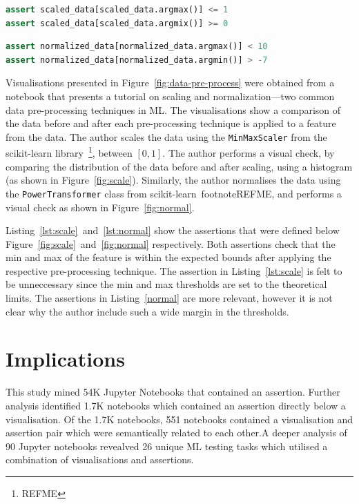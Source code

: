 \documentclass[conference]{IEEEtran}
\begin{document}
\begin{lstlisting}[language=Python, caption={Assertion to check that the mix and max of a feature fall within specified threshold derived from the visualisation presented in Figure~\ref{fig:scale}.}, label={lst:scale}]
assert scaled_data[scaled_data.argmax()] <= 1
assert scaled_data[scaled_data.argmix()] >= 0
\end{lstlisting}

\begin{lstlisting}[language=Python, caption={Similar premise as Listing~\ref{lst:scale}, however this assertion is based on Figure~\ref{fig:normal}.}, label={lst:normal}]
assert normalized_data[normalized_data.argmax()] < 10
assert normalized_data[normalized_data.argmin()] > -7
\end{lstlisting}

Visualisations presented in Figure~\ref{fig:data-pre-process} were obtained from a notebook that presents a tutorial on scaling and normalization---two common data pre-processing techniques in ML. The visualisations show a comparison of the data before and after each pre-processing technique is applied to a feature from the data. The author scales the data using the \texttt{MinMaxScaler} from the scikit-learn library~\footnote{REFME}, between $[0, 1]$. The author performs a visual check, by comparing the distribution of the data before and after scaling, using a histogram (as shown in Figure~\ref{fig:scale}). Similarly, the author normalises the data using the \texttt{PowerTransformer} class from scikit-learn~footnote{REFME}, and performs a visual check as shown in Figure~\ref{fig:normal}.

Listing~\ref{lst:scale}~and~\ref{lst:normal} show the assertions that were defined below Figure~\ref{fig:scale}~and~\ref{fig:normal} respectively. Both assertions check that the min and max of the feature is within the expected bounds after applying the respective pre-processing technique. The assertion in Listing~\ref{lst:scale} is felt to be unneccessary since the min and max thresholds are set to the theoretical limits. The assertions in Listing~\ref{normal} are more relevant, however it is not clear why the author include such a wide margin in the thresholds.

\section{Implications}\label{sec:discuss}

This study mined 54K Jupyter Notebooks that contained an assertion. Further analysis identified 1.7K notebooks which contained an assertion directly below a visualisation. Of the 1.7K notebooks, 551 notebooks contained a visualisation and assertion pair which were semantically related to each other.A deeper analysis of 90 Jupyter notebooks revealved 26 unique ML testing tasks which utilised a combination of visualisations and assertions.
\end{document}
